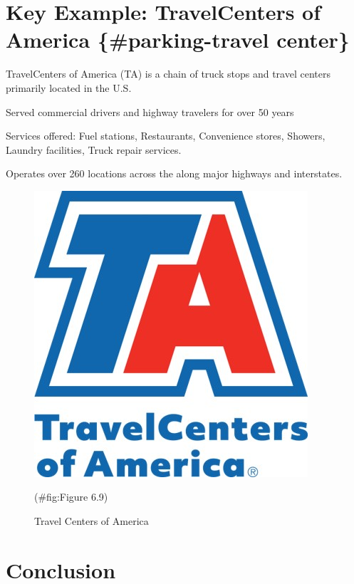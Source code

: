 \documentclass[
]{book}
\begin{document}
\hypertarget{key-example-travelcenters-of-america-parking-travel-center}{%
\section{Key Example: TravelCenters of America \{\#parking-travel center\}}\label{key-example-travelcenters-of-america-parking-travel-center}}

TravelCenters of America (TA) is a chain of truck stops and travel centers primarily located in the U.S.

Served commercial drivers and highway travelers for over 50 years

Services offered:
Fuel stations, Restaurants, Convenience stores, Showers, Laundry facilities, Truck repair services.

Operates over 260 locations across the along major highways and interstates.

\begin{figure}

{\centering \includegraphics{./Images/Parking/Travel Centers of America} 

}

\caption{Travel Centers of America}(\#fig:Figure 6.9)
\end{figure}

\hypertarget{parking-conclusions}{%
\section{Conclusion}\label{parking-conclusions}}
\end{document}
